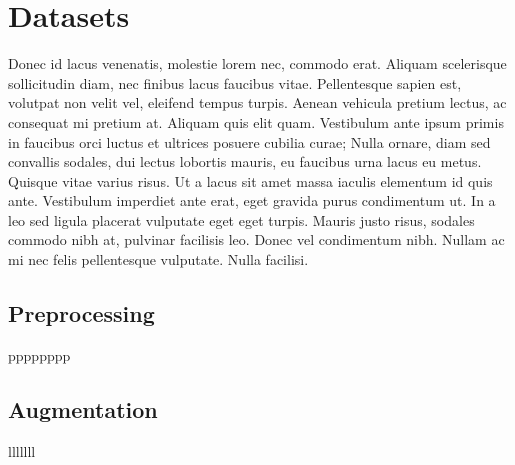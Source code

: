 
\chapter{Datasets}
Donec id lacus venenatis, molestie lorem nec, commodo erat. Aliquam scelerisque sollicitudin diam, nec finibus lacus faucibus vitae. Pellentesque sapien est, volutpat non velit vel, eleifend tempus turpis. Aenean vehicula pretium lectus, ac consequat mi pretium at. Aliquam quis elit quam. Vestibulum ante ipsum primis in faucibus orci luctus et ultrices posuere cubilia curae; Nulla ornare, diam sed convallis sodales, dui lectus lobortis mauris, eu faucibus urna lacus eu metus. Quisque vitae varius risus. Ut a lacus sit amet massa iaculis elementum id quis ante. Vestibulum imperdiet ante erat, eget gravida purus condimentum ut. In a leo sed ligula placerat vulputate eget eget turpis. Mauris justo risus, sodales commodo nibh at, pulvinar facilisis leo. Donec vel condimentum nibh. Nullam ac mi nec felis pellentesque vulputate. Nulla facilisi.
\section{Preprocessing}
pppppppp
\section{Augmentation}
lllllll